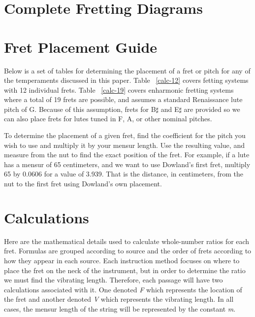 \appendix

\chapter{Complete Fretting Diagrams}





\chapter{Fret Placement Guide}

Below is a set of tables for determining the placement of a fret or pitch for any of the 
temperaments discussed in this paper. Table ~\ref{calc-12} covers fetting systems with
12 individual frets.  Table ~\ref{calc-19} covers enharmonic fretting systems where
a total of 19 frets are possible, and assumes a standard Renaissance lute pitch of
G.  Because of this assumption, frets for B$\sharp$ and E$\sharp$ are provided so 
we can also place frets for lutes tuned in F, A, or other nominal pitches.

To determine the placement of a given fret, find the coefficient for the pitch
you wish to use and multiply it by your mensur length.  Use the resulting value,
and measure from the nut to find the exact position of the fret.  For example,
if a lute has a mensur of 65 centimeters, and we want to use Dowland's first fret,
multiply 65 by 0.0606 for a value of 3.939.  That is the distance, in centimeters,
from the nut to the first fret using Dowland's own placement.





\chapter{Calculations}

Here are the mathematical details used to calculate whole-number ratios for each fret.
Formulas are grouped according to source and the order of frets according to how they
appear in each source.  Each instruction method focuses on where to place the fret on
the neck of the instrument, but in order to determine the ratio we must find the
vibrating length. Therefore, each passage will have two calculations associated with
it.  One denoted \textit{F} which represents the location of the fret and another
denoted \textit{V} which represents the vibrating length.  In all cases, the mensur
length of the string will be represented by the constant \textit{m}.

